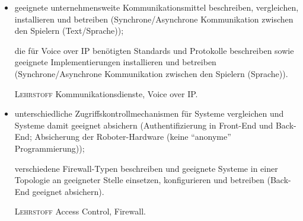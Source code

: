 \begin{itemize}[label={-}]
    \item geeignete unternehmensweite Kommunikationsmittel beschreiben, vergleichen, installieren und betreiben
        {\color{red}(Synchrone/Asynchrone Kommunikation zwischen den Spielern (Text/Sprache))};
    \item[] die für Voice over IP benötigten Standards und Protokolle beschreiben sowie geeignete Implementierungen installieren und betreiben
        {\color{red}(Synchrone/Asynchrone Kommunikation zwischen den Spielern (Sprache))}.
    \item[\tiny\textsc{Lehrstoff}] Kommunikationsdienste, Voice over IP.\lehrstoffrule
  
    \item unterschiedliche Zugriffskontrollmechanismen für Systeme vergleichen und Systeme damit geeignet absichern
        {\color{red}(Authentifizierung in Front-End und Back-End; Absicherung der Roboter-Hardware (keine \enquote{anonyme} Programmierung))};
    \item[] verschiedene Firewall-Typen beschreiben und geeignete Systeme in einer Topologie an geeigneter Stelle einsetzen, konfigurieren und betreiben
        {\color{red}(Back-End geeignet absichern)}.
    \item[\tiny\textsc{Lehrstoff}] Access Control, Firewall.
\end{itemize}

